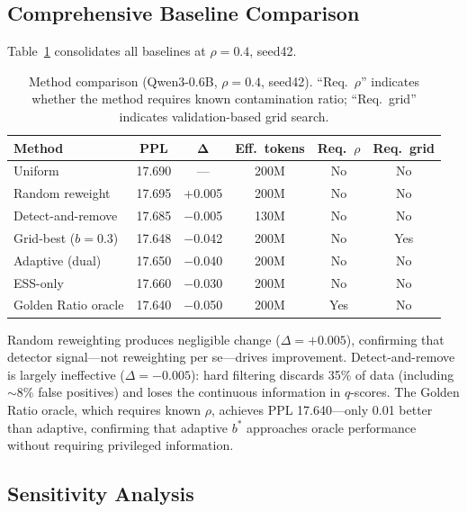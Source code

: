 \documentclass[11pt,a4paper]{article}
\newcommand{\bstar}{b^{*}}
\begin{document}
\subsection{Comprehensive Baseline Comparison}
\label{sec:baselines}

Table~\ref{tab:baselines} consolidates all baselines at $\rho=0.4$, seed42.

\begin{table}[t]
\centering
\small
\caption{Method comparison (Qwen3-0.6B, $\rho=0.4$, seed42). ``Req.\ $\rho$'' indicates whether the method requires known contamination ratio; ``Req.\ grid'' indicates validation-based grid search.}
\label{tab:baselines}
\begin{tabular}{lccccc}
\toprule
\textbf{Method} & \textbf{PPL} & $\boldsymbol{\Delta}$ & \textbf{Eff.\ tokens} & \textbf{Req.\ $\rho$} & \textbf{Req.\ grid} \\
\midrule
Uniform & 17.690 & --- & 200M & No & No \\
Random reweight & 17.695 & +0.005 & 200M & No & No \\
Detect-and-remove & 17.685 & $-$0.005 & 130M & No & No \\
Grid-best ($b\!=\!0.3$) & 17.648 & $-$0.042 & 200M & No & Yes \\
Adaptive (dual) & 17.650 & $-$0.040 & 200M & No & No \\
ESS-only & 17.660 & $-$0.030 & 200M & No & No \\
Golden Ratio oracle & 17.640 & $-$0.050 & 200M & Yes & No \\
\bottomrule
\end{tabular}
\end{table}

Random reweighting produces negligible change ($\Delta=+0.005$), confirming that detector signal---not reweighting per se---drives improvement.
Detect-and-remove is largely ineffective ($\Delta=-0.005$): hard filtering discards 35\% of data (including $\sim$8\% false positives) and loses the continuous information in $q$-scores.
The Golden Ratio oracle, which requires known $\rho$, achieves PPL 17.640---only 0.01 better than adaptive, confirming that adaptive $\bstar$ approaches oracle performance without requiring privileged information.

\subsection{Sensitivity Analysis}
\label{sec:sensitivity}
\end{document}
